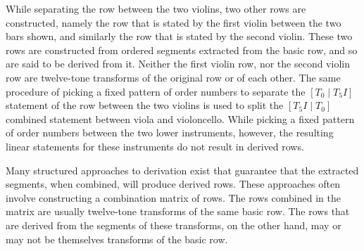 \noindent While separating the row between the two violins, two other rows are constructed, namely the row that is stated by the first violin between the two bars shown, and similarly the row that is stated by the second violin. These two rows are constructed from ordered segments extracted from the basic row, and so are said to be derived from it. Neither the first violin row, nor the second violin row are twelve-tone transforms of the original row or of each other. The same procedure of picking a fixed pattern of order numbers to separate the $[T_0 \; | \; T_5I]$ statement of the row between the two violins is used to split the $[T_5I \; | \; T_0]$ combined statement between viola and violoncello. While picking a fixed pattern of order numbers between the two lower instruments, however, the resulting linear statements for these instruments do not result in derived rows.

Many structured approaches to derivation exist that guarantee that the extracted segments, when combined, will produce derived rows. These approaches often involve constructing a combination matrix of rows. The rows combined in the matrix are usually twelve-tone transforms of the same basic row. The rows that are derived from the segments of these transforms, on the other hand, may or may not be themselves transforms of the basic row.


